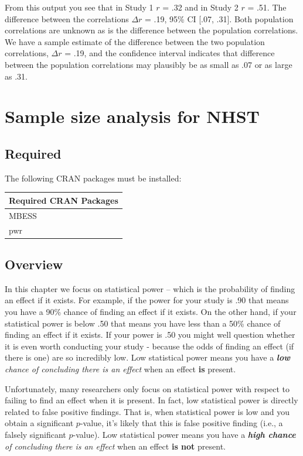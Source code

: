 \documentclass[
]{krantz}
\begin{document}
From this output you see that in Study 1 \(r\) = .32 and in Study 2 \(r\) = .51. The difference between the correlations \(\Delta r\) = .19, 95\% CI {[}.07, .31{]}. Both population correlations are unknown as is the difference between the population correlations. We have a sample estimate of the difference between the two population correlations, \(\Delta r\) = .19, and the confidence interval indicates that difference between the population correlations may plausibly be as small as .07 or as large as .31.

\hypertarget{sample-size-analysis-for-nhst}{%
\chapter{Sample size analysis for NHST}\label{sample-size-analysis-for-nhst}}

\hypertarget{required}{%
\section{Required}\label{required}}

The following CRAN packages must be installed:

\begin{longtable}[]{@{}l@{}}
\toprule
Required CRAN Packages\tabularnewline
\midrule
\endhead
MBESS\tabularnewline
pwr\tabularnewline
\bottomrule
\end{longtable}

\hypertarget{overview}{%
\section{Overview}\label{overview}}

In this chapter we focus on statistical power -- which is the probability of finding an effect if it exists. For example, if the power for your study is .90 that means you have a 90\% chance of finding an effect if it exists. On the other hand, if your statistical power is below .50 that means you have less than a 50\% chance of finding an effect if it exists. If your power is .50 you might well question whether it is even worth conducting your study - because the odds of finding an effect (if there is one) are so incredibly low. Low statistical power means you have a \emph{\textbf{low} chance of concluding there is an effect} when an effect \textbf{is} present.

Unfortunately, many researchers only focus on statistical power with respect to failing to find an effect when it is present. In fact, low statistical power is directly related to false positive findings. That is, when statistical power is low and you obtain a significant \(p\)-value, it's likely that this is false positive finding (i.e., a falsely significant \(p\)-value). Low statistical power means you have a \emph{\textbf{high chance} of concluding there is an effect} when an effect \textbf{is not} present.
\end{document}
